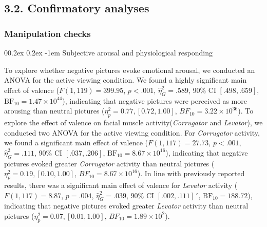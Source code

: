 \documentclass[
  man,floatsintext]{apa6}
\makeatletter
\let\oldparagraph\paragraph
\renewcommand{\paragraph}[1]{\oldparagraph{#1}\mbox{}}
\renewcommand{\paragraph}{\@startsection{paragraph}{4}{\parindent}%
  {0\baselineskip \@plus 0.2ex \@minus 0.2ex}%
  {-1em}%
  {\normalfont\normalsize\bfseries\itshape\typesectitle}}
\makeatother
\begin{document}
\hypertarget{confirmatory-analyses}{%
\subsection{3.2. Confirmatory analyses}\label{confirmatory-analyses}}

\hypertarget{manipulation-checks}{%
\subsubsection{Manipulation checks}\label{manipulation-checks}}

\hypertarget{subjective-arousal-and-physiological-responding}{%
\paragraph{Subjective arousal and physiological responding}\label{subjective-arousal-and-physiological-responding}}

To explore whether negative pictures evoke emotional arousal, we conducted an ANOVA for the active viewing condition.
We found a highly significant main effect of valence (\(F(1, 119) = 399.95\), \(p < .001\), \(\hat{\eta}^2_G = .589\), 90\% CI \([.498, .659]\), \(\mathrm{BF}_{\textrm{10}} = 1.47 \times 10^{44}\)), indicating that negative pictures were perceived as more arousing than neutral pictures (\(\eta_{p}^{2}=0.77, [0.72, 1.00]\), \(BF_{10}=\)\(3.22 \times 10^{36}\)).
To explore the effect of valence on facial muscle activity(\emph{Corrugator} and \emph{Levator}), we conducted two ANOVA for the active viewing condition.
For \emph{Corrugator} activity, we found a significant main effect of valence (\(F(1, 117) = 27.73\), \(p < .001\), \(\hat{\eta}^2_G = .111\), 90\% CI \([.037, .206]\), \(\mathrm{BF}_{\textrm{10}} = 8.67 \times 10^{16}\)), indicating that negative pictures evoked greater \emph{Corrugator} activity than neutral pictures (\(\eta_{p}^{2}=0.19, [0.10, 1.00]\), \(BF_{10}=\)\(8.67 \times 10^{16}\)).
In line with previously reported results, there was a significant main effect of valence for \emph{Levator} activity (\(F(1, 117) = 8.87\), \(p = .004\), \(\hat{\eta}^2_G = .039\), 90\% CI \([.002, .111]\)´, \(\mathrm{BF}_{\textrm{10}} = 188.72\)), indicating that negative pictures evoked greater \emph{Levator} activity than neutral pictures (\(\eta_{p}^{2}=0.07, [0.01, 1.00]\), \(BF_{10}=\)\(1.89 \times 10^{2}\)).
\end{document}
